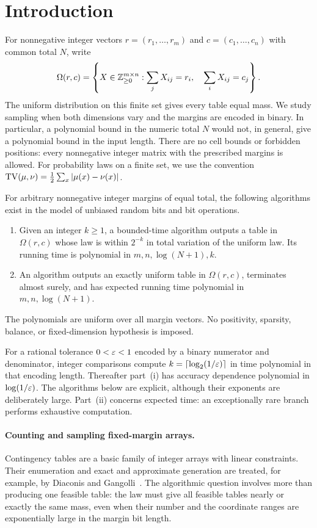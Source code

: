\section{Introduction}\label{sec:introduction}

For nonnegative integer vectors $r=(r_1,\ldots,r_m)$ and
$c=(c_1,\ldots,c_n)$ with common total $N$, write
\[
 \Omega(r,c)=\left\{X\in\mathbb{Z}_{\ge0}^{m\times n}:
       \sum_jX_{ij}=r_i,\quad \sum_iX_{ij}=c_j\right\}.
\]
The uniform distribution on this finite set gives every table equal mass.
We study sampling when both dimensions vary and the margins are encoded
in binary. In particular, a polynomial bound in the numeric total $N$
would not, in general, give a polynomial bound in the input length.
There are no cell bounds or forbidden positions: every nonnegative integer
matrix with the prescribed margins is allowed. For probability laws on a
finite set, we use the convention
$\operatorname{TV}(\mu,\nu)=\tfrac12\sum_x|\mu(x)-\nu(x)|$.

\begin{theorem}\label{thm:main}
For arbitrary nonnegative integer margins of equal total, the following
algorithms exist in the model of unbiased random bits and bit operations.
\begin{enumerate}[label=\textup{(\roman*)}]
 \item Given an integer $k\ge1$, a bounded-time algorithm outputs a table
 in $\Omega(r,c)$ whose law is within $2^{-k}$ in total variation of the
 uniform law. Its running time is polynomial in
 $m,n,\log(N+1),k$.
 \item An algorithm outputs an exactly uniform table in $\Omega(r,c)$,
 terminates almost surely, and has expected running time polynomial in
 $m,n,\log(N+1)$.
\end{enumerate}
The polynomials are uniform over all margin vectors. No positivity,
sparsity, balance, or fixed-dimension hypothesis is imposed.
\end{theorem}

For a rational tolerance $0<\varepsilon<1$ encoded by a binary numerator and
denominator, integer comparisons compute
$k=\lceil\log_2(1/\varepsilon)\rceil$ in time polynomial in that encoding length.
Thereafter part~\textup{(i)} has accuracy dependence polynomial in
$\log(1/\varepsilon)$.
The algorithms below are explicit, although their exponents are deliberately
large. Part~\textup{(ii)} concerns expected time: an exceptionally rare
branch performs exhaustive computation.

\paragraph{Counting and sampling fixed-margin arrays.}
Contingency tables are a basic family of integer arrays with linear
constraints. Their enumeration and exact and approximate generation are
treated, for example, by Diaconis and Gangolli~\cite{DiaconisGangolli1995}.
The algorithmic question involves more than producing one feasible table:
the law must give all feasible tables nearly or exactly the same mass,
even when their number and the coordinate ranges are exponentially large
in the margin bit length.

